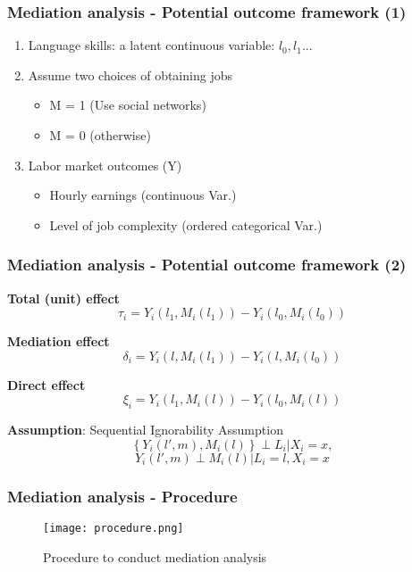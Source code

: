 \documentclass{beamer}
\begin{document}

\begin{frame}
\frametitle{Mediation analysis - Potential outcome framework (1)}
\begin{enumerate}

\item Language skills: a latent continuous variable: $l_{0}, l_{1}$... \\

\item Assume two choices of obtaining jobs
\begin{itemize}
\item M = 1 (Use social networks)
\item M = 0 (otherwise)
\end{itemize}

\item Labor market outcomes (Y)
\begin{itemize}
\item Hourly earnings (continuous Var.)
\item Level of job complexity (ordered categorical Var.)
\end{itemize}

\end{enumerate}

\end{frame}


\begin{frame} %
\frametitle{Mediation analysis - Potential outcome framework (2)}
\textbf{Total (unit) effect}
$$\tau_{i} = Y_{i}(l_{1}, M_{i}(l_{1})) - Y_{i}(l_{0}, M_{i}(l_{0}))$$

\textbf{Mediation effect}
$$\delta_{i} = Y_{i}(l, M_{i}(l_{1})) - Y_{i}(l, M_{i}(l_{0}))$$

\textbf{Direct effect}
$$\xi_{i} = Y_{i}(l_{1}, M_{i}(l)) - Y_{i}(l_{0}, M_{i}(l))$$

\textbf{Assumption}: Sequential Ignorability Assumption
$$\left \{Y_{i}(l', m), M_{i}(l)\right \} \perp L_{i}|X_{i}=x, $$
$$Y_{i}(l', m) \perp M_{i}(l)|L_{i}=l, X_{i}=x $$

\end{frame}


\begin{frame}
\frametitle{Mediation analysis - Procedure}
\begin{figure}
\centering
\texttt{[image: procedure.png]}
\caption{Procedure to conduct mediation analysis}
\end{figure}
\end{frame}
\end{document}
